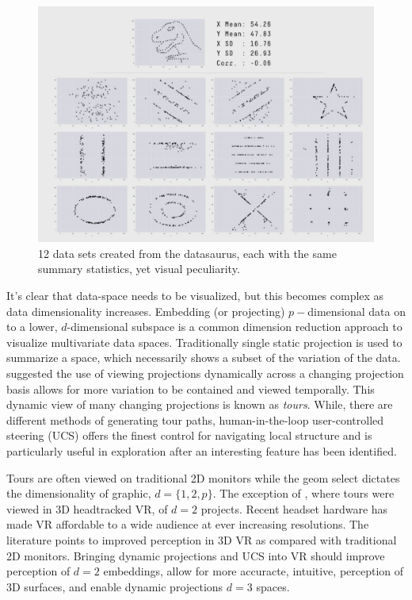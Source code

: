 \documentclass{monashthesis}
\begin{document}
\begin{figure}

{\centering \includegraphics[width=0.7\linewidth]{./figures/matejka17fig} 

}

\caption{12 data sets created from the datasaurus, each
with the same summary statistics, yet visual peculiarity.}\label{fig:matejka17fig}
\end{figure}

It's clear that data-space needs to be visualized, but this becomes
complex as data dimensionality increases. Embedding (or projecting)
\(p-\)dimensional data on to a lower, \(d\)-dimensional subspace is a
common dimension reduction approach to visualize multivariate data
spaces. Traditionally single static projection is used to summarize a
space, which necessarily shows a subset of the variation of the data.
\textcite{asimov_grand_1985} suggested the use of viewing projections
dynamically across a changing projection basis allows for more variation
to be contained and viewed temporally. This dynamic view of many
changing projections is known as \emph{tours}. While, there are
different methods of generating tour paths, human-in-the-loop
user-controlled steering (UCS) offers the finest control for navigating
local structure and is particularly useful in exploration after an
interesting feature has been identified.

Tours are often viewed on traditional 2D monitors while the geom select
dictates the dimensionality of graphic, \(d=\{1, 2, p\}\). The exception
of \textcite{nelson_xgobi_1998}, where tours were viewed in 3D
headtracked VR, of \(d=2\) projects. Recent headset hardware has made VR
affordable to a wide audience at ever increasing resolutions. The
literature points to improved perception in 3D VR as compared with
traditional 2D monitors. Bringing dynamic projections and UCS into VR
should improve perception of \(d=2\) embeddings, allow for more
accuracte, intuitive, perception of 3D surfaces, and enable dynamic
projections \(d=3\) spaces.
\end{document}
